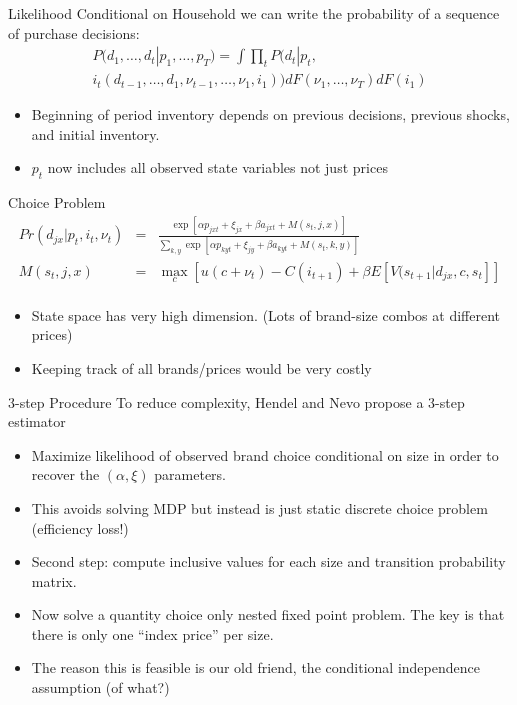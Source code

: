 \documentclass[xcolor=pdftex,dvipsnames,table,mathserif,aspectratio=169]{beamer}
\begin{document}
\begin{frame}{Likelihood}
Conditional on Household we can write the probability of a sequence of purchase decisions:
\begin{eqnarray*}
P(d_1,\ldots,d_t | p_1,\ldots,p_T) = \int \prod_t P(d_t | p_t, \\
i_t(d_{t-1},\ldots,d_1, \nu_{t-1},\ldots,\nu_1,i_1))dF(\nu_1,\ldots,\nu_T) dF(i_1)
\end{eqnarray*}
\begin{itemize}
\item Beginning of period inventory depends on previous decisions, previous shocks, and initial inventory.
\item $p_t$ now includes all observed state variables not just prices
\end{itemize}
\end{frame}

\begin{frame}{Choice Problem}
\begin{eqnarray*}
Pr(d_{jx} | p_t,i_t,\nu_t) &=& \frac{\exp[\alpha p_{jxt} + \xi_{jx} + \beta a_{jxt} + M(s_t,j,x)]}{\sum_{k,y} \exp[\alpha p_{kyt} + \xi_{jy} + \beta a_{kyt} + M(s_t,k,y)]}\\
M (s_t,j,x) &=& \max_c [ u(c+\nu_t) - C(i_{t+1}) + \beta E[V(s_{t+1}|d_{jx},c,s_t]]\\
\end{eqnarray*}
\begin{itemize}
\item State space has very high dimension. (Lots of brand-size combos at different prices)
\item Keeping track of all brands/prices would be very costly
\end{itemize}
\end{frame}

\begin{frame}{3-step Procedure}
To reduce complexity, Hendel and Nevo propose a 3-step estimator
\begin{itemize}
\item Maximize likelihood of observed brand choice \alert{conditional} on size in order to recover the $(\alpha,\xi)$ parameters.
\item This avoids solving MDP but instead is just static discrete choice problem (efficiency loss!)
\item Second step: compute \alert{inclusive values} for each size and transition probability matrix.
\item Now solve a quantity choice only nested fixed point problem. The key is that there is \alert{only one ``index price'' per size}.
\item The reason this is feasible is our old friend, the \alert{conditional independence assumption} (of what?)
\end{itemize}
\end{frame}
\end{document}
